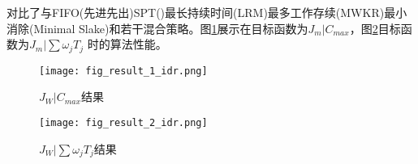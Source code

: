 对比了与FIFO(先进先出)SPT()最长持续时间(LRM)最多工作存续(MWKR)最小消除(Minimal Slake)和若干混合策略。图\ref{fig:result_1}展示在目标函数为$J_m|C_{max}$，图\ref{fig:result_2}目标函数为$J_m|\sum \omega_jT_j$ 时的算法性能。

\begin{figure}
    \texttt{[image: fig\_result\_1\_idr.png]}
    \caption{$J_W|C_{max}$结果}
    \label{fig:result_1}
\end{figure}

\begin{figure}
    \texttt{[image: fig\_result\_2\_idr.png]}
    \caption{$J_W|\sum \omega_jT_j$结果}
    \label{fig:result_2}
\end{figure}

